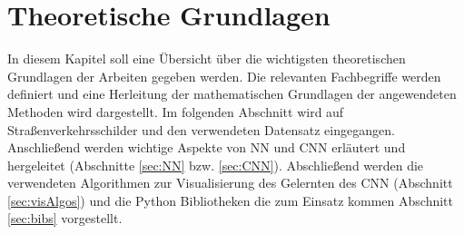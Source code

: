 \newpage
\section{Theoretische Grundlagen} \label{infos}
In diesem Kapitel soll eine Übersicht über die wichtigsten theoretischen Grundlagen der Arbeiten gegeben werden. Die relevanten Fachbegriffe werden definiert und eine Herleitung der mathematischen Grundlagen der angewendeten Methoden wird dargestellt. Im folgenden Abschnitt wird auf Straßenverkehrsschilder und den verwendeten Datensatz eingegangen.  Anschließend werden wichtige Aspekte von \ac{NN} und \ac{CNN} erläutert und hergeleitet (Abschnitte \ref{sec:NN} bzw. \ref{sec:CNN}). Abschließend werden die verwendeten Algorithmen zur Visualisierung des Gelernten des \ac{CNN} (Abschnitt \ref{sec:visAlgos}) und die Python Bibliotheken die zum Einsatz kommen Abschnitt \ref{sec:bibs} vorgestellt. 
 



